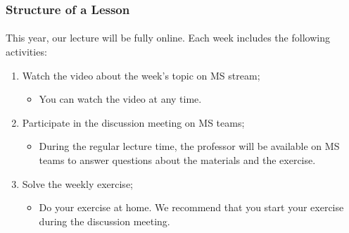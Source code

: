 \documentclass{beamer}
\begin{document}
%
%

\begin{frame}
  \frametitle{Structure of a Lesson}
  \framesubtitle{}

  This year, our lecture will be fully online. Each week includes the following activities:
  \bigskip

  \begin{enumerate}
  \item Watch the video about the week's topic on MS stream;
  \begin{itemize}
    \item You can watch the video at any time.
  \end{itemize}
  \item Participate in the discussion meeting on MS teams;
  \begin{itemize}
    \item During the regular lecture time, the professor will be available on MS teams to answer questions about the materials and the exercise.
  \end{itemize}
  \item Solve the weekly exercise;
  \begin{itemize}
    \item Do your exercise at home. We recommend that you start your exercise during the discussion meeting.
  \end{itemize}
  \end{enumerate}

\end{frame}
\end{document}
